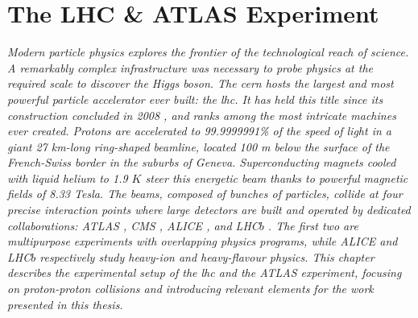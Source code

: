 \chapter{\color{oxfordblue} The LHC \& ATLAS Experiment}\label{chapter-ATLAS}
\ChapFrame

\textit{
Modern particle physics explores the frontier of the technological reach of science. A remarkably complex infrastructure was necessary to probe physics at the required scale to discover the Higgs boson. The \gls{cern} hosts the largest and most powerful particle accelerator ever built: the \gls{lhc}. It has held this title since its construction concluded in 2008 \cite{LyndonEvans_2008}, and ranks among the most intricate machines ever created. Protons are accelerated to 99.9999991\% of the speed of light in a giant 27 km-long ring-shaped beamline, located 100 m below the surface of the French-Swiss border in the suburbs of Geneva. Superconducting magnets cooled with liquid helium to 1.9 $K$ steer this energetic beam thanks to powerful magnetic fields of 8.33 Tesla. The beams, composed of bunches of particles, collide at four precise interaction points where large detectors are built and operated by dedicated collaborations: ATLAS \cite{TheATLASCollaboration_2008}, CMS \cite{TheCMSCollaboration_2008}, ALICE \cite{TheALICECollaboration_2008}, and LHC$b$ \cite{TheLHCbCollaboration_2008}. The first two are multipurpose experiments with overlapping physics programs, while ALICE and LHC$b$ respectively study heavy-ion and heavy-flavour physics. This chapter describes the experimental setup of the \gls{lhc} and the ATLAS experiment, focusing on proton-proton collisions and introducing relevant elements for the work presented in this thesis.} 

